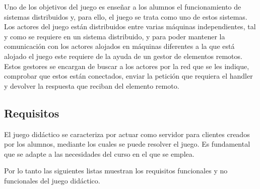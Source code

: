Uno de los objetivos del juego es enseñar a los alumnos el funcionamiento de sistemas distribuidos y, para ello, el juego se trata como uno de estos sistemas. Los actores del juego están distribuidos entre varias máquinas independientes, tal y como se requiere en un sistema distribuido, y para poder mantener la comunicación con los actores alojados en máquinas diferentes a la que está alojado el juego este requiere de la ayuda de un gestor de elementos remotos. Estos gestores se encargan de buscar a los actores por la red que se les indique, comprobar que estos están conectados, enviar la petición que requiera el handler y devolver la respuesta que reciban del elemento remoto.

\subsection{Requisitos}

El juego didáctico se caracteriza por actuar como servidor para clientes creados por los alumnos, mediante los cuales se puede resolver el juego. Es fundamental que se adapte a las necesidades del curso en el que se emplea.

Por lo tanto las siguientes listas muestran los requisitos funcionales y no funcionales del juego didáctico.

\vspace{1cm}

